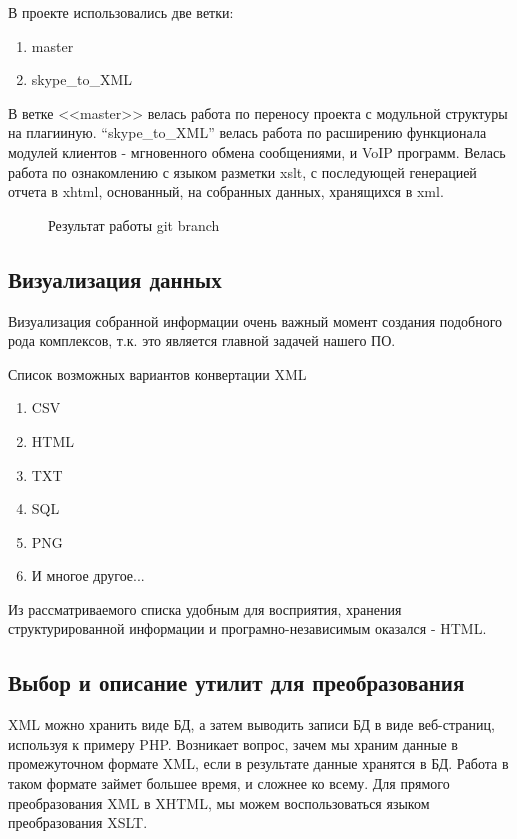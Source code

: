 В проекте использовались две ветки:

\begin{enumerate}
\item master
\item skype\_to\_XML
\end{enumerate}

 В ветке <<master>> велась работа по переносу проекта с модульной структуры на плагииную. ``skype\_to\_XML'' велась работа по расширению функционала модулей клиентов - мгновенного обмена сообщениями, и VoIP программ. Велась работа по ознакомлению с языком разметки xslt, с последующей генерацией отчета в xhtml, основанный, на собранных данных, хранящихся в xml.

\begin{figure}[h]
\caption{Результат работы git branch}
\label{pic:branch_project}
\end{figure}

\subsection{Визуализация данных}
Визуализация собранной информации очень важный момент создания подобного рода комплексов, т.к. это является главной задачей нашего ПО. 

Список возможных вариантов конвертации XML
\begin{enumerate}
\item CSV
\item HTML
\item TXT
\item SQL

\item PNG
\item И многое другое...
\end{enumerate}

Из рассматриваемого списка удобным для восприятия, хранения структурированной информации и 
програмно-независимым%
оказался - HTML.

\subsection{Выбор и описание утилит для преобразования}

XML можно хранить виде БД, а затем выводить записи БД в виде веб-страниц, используя к примеру PHP. Возникает вопрос, зачем мы храним данные в промежуточном формате XML, если в результате данные хранятся в БД. Работа в таком формате займет большее время, и сложнее ко всему. Для прямого преобразования XML в XHTML, мы можем воспользоваться языком преобразования XSLT. 

